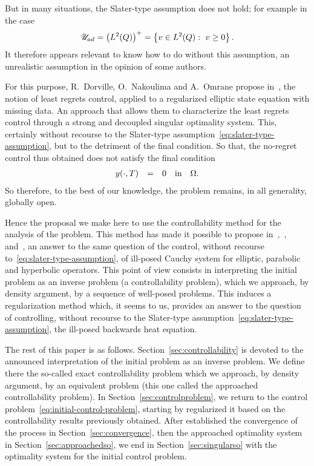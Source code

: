 But in many situations, the Slater-type assumption does not hold; for
example in the case
\begin{equation*}
    \uad = {\left({\Ldeux{Q}}\right)}^{+} = \left\{{%
        v\in\Ldeux{Q}:\ v\geq 0
    }\right\}.
\end{equation*}
It therefore appears relevant to know how to do without this assumption, an
unrealistic assumption in the opinion of some authors.

For this purpose,  R.~Dorville, O.~Nakoulima and A.~Omrane propose
in~\cite{dorville}, the notion of least regrets control, applied to a
regularized elliptic state equation with missing data. An approach that
allows them to characterize the least regrets control through a strong and
decoupled singular optimality system. This, certainly without recourse to
the Slater-type assumption~\eqref{eq:slater-type-assumption}, but to the
detriment of the final condition. So that, the no-regret control thus
obtained does not satisfy the final condition
\begin{equation*}
    \begin{array}{rclll}
        {y}\!\left({\cdot,T}\right) & = & 0 & \text{in} & \Omega.
    \end{array}
\end{equation*}
So therefore, to the best of our knowledge, the problem remains, in all
generality, globally open.

Hence the proposal we make here to use the controllability method for the
analysis of the problem. This method has made it possible to propose
in~\cite{ownElliptic},~\cite{ownAAA},~\cite{ownParabolic}
and~\cite{ownhyperbolic}, an answer to the same question of the control,
without recourse to~\eqref{eq:slater-type-assumption}, of ill-posed Cauchy
system for elliptic, parabolic and hyperbolic operators. This point of view
consists in interpreting the initial problem as an inverse problem (a
controllability problem), which we approach, by density argument, by a
sequence of well-posed problems. This induces a regularization method
which, it seems to us, provides an answer to the question of controlling,
without recourse to the Slater-type
assumption~\eqref{eq:slater-type-assumption}, the ill-posed backwards heat
equation.

The rest of this paper is as follows. Section~\ref{sec:controllability}
is devoted to the announced interpretation of the initial problem as an
inverse problem. We define there the so-called exact controllability
problem which we approach, by density argument, by an equivalent problem
(this one called the approached controllability problem). In
Section~\ref{sec:controlproblem}, we return to the control
problem~\eqref{eq:initial-control-problem}, starting by regularized it
based on the controllability results previously obtained. After established
the convergence of the process in Section~\ref{sec:convergence}, then the
approached optimality system in Section~\ref{sec:approachedso}, we end in
Section~\ref{sec:singularso} with the optimality system for the initial
control problem.
